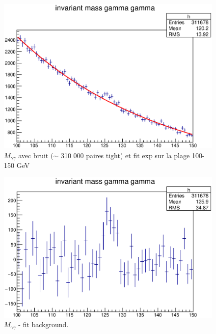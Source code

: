 \documentclass[11pt]{article} %
\begin{document}
\begin{figure}[h!]
  \caption{$M_{\gamma \gamma}$ avec bruit ($\sim$ 310 000 paires tight) et fit exp sur la plage 100-150 GeV }
\includegraphics{../graphes/mgg_avec_bruit}
\end{figure}

\begin{figure}[h!]
  \caption{$M_{\gamma \gamma}$ - fit background.}
\includegraphics{../graphes/mgg_minus_bckgrnd_50}
\end{figure}
\end{document}
